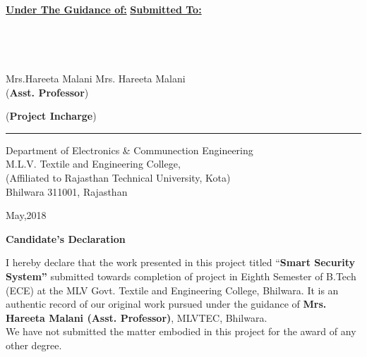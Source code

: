 \documentclass[twoside,a4paper,16pt]{book}
\begin{document}
	\vspace{0cm}
	
	
	\Large {\underline{\bf Under The Guidance of:}} \hspace{7.5cm} {\underline{\bf Submitted To:}}\\\\
	\\
	\\
	\\
	\hspace{-1.5cm}Mrs.Hareeta Malani  \hspace{9.4cm} Mrs. Hareeta Malani  \\{\small({\bf Asst. Professor})}\hspace{11cm} {\small({\bf Project Incharge})\\
	
	

	
	\begin{center}
		{
				{\rule{190mm}{0.2mm}}
			\small Department of Electronics \& Communection Engineering\\
			M.L.V. Textile and Engineering College,\\(Affiliated to Rajasthan Technical University, Kota)
			\\Bhilwara 311001, Rajasthan
			\vspace{0}
		
		{\small May,2018}
	}
	
	\end{center}

\newpage
\begin{center}
	\huge{\bf Candidate’s Declaration}\\

\end{center}
{\large 
	\vspace{1.5cm}
 I hereby declare that the work presented in this project titled {“\bf Smart Security System”} submitted towards completion of project in Eighth Semester of B.Tech (ECE) at the MLV Govt. Textile and Engineering College, Bhilwara.  It is an authentic record of our original work pursued under the guidance of {\bf Mrs. Hareeta Malani (Asst. Professor)}, MLVTEC, Bhilwara. \\
 We have not submitted the matter embodied in this project for the award of any other degree. \\\vspace{.5cm}\\
 
}}
\end{document}
